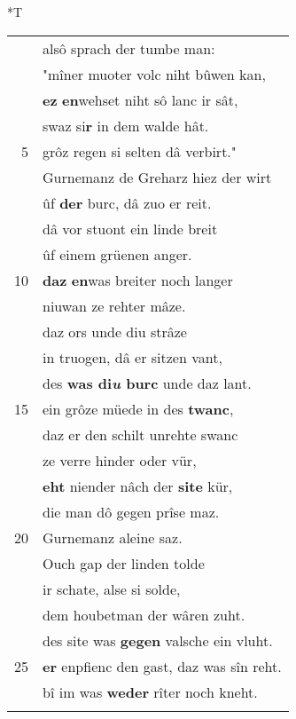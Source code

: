\documentclass[8pt,a4paper,notitlepage]{article}
\begin{document}
\begin{table}[ht]
\begin{minipage}[t]{0.5\linewidth}
\end{minipage}
\hspace{0.5cm}
\begin{minipage}[t]{0.5\linewidth}
\small
\begin{center}*T
\end{center}
\begin{tabular}{rl}
 & alsô sprach der tumbe man:\\ 
 & "mîner muoter volc niht bûwen kan,\\ 
 & \textbf{ez} \textbf{en}wehset niht sô lanc ir sât,\\ 
 & swaz si\textbf{r} in dem walde hât.\\ 
5 & grôz regen si selten dâ verbirt."\\ 
 & Gurnemanz de Greharz hiez der wirt\\ 
 & ûf \textbf{der} burc, dâ zuo er reit.\\ 
 & dâ vor stuont ein linde breit\\ 
 & ûf einem grüenen anger.\\ 
10 & \textbf{daz} \textbf{en}was breiter noch langer\\ 
 & niuwan ze rehter mâze.\\ 
 & daz ors unde diu strâze\\ 
 & in truogen, dâ er sitzen vant,\\ 
 & des \textbf{was di\textit{u} burc} unde daz lant.\\ 
15 & ein grôze müede in des \textbf{twanc},\\ 
 & daz er den schilt unrehte swanc\\ 
 & ze verre hinder oder vür,\\ 
 & \textbf{eht} niender nâch der \textbf{site} kür,\\ 
 & die man dô gegen prîse maz.\\ 
20 & Gurnemanz aleine saz.\\ 
 & Ouch gap der linden tolde\\ 
 & ir schate, alse si solde,\\ 
 & dem houbetman der wâren zuht.\\ 
 & des site was \textbf{gegen} valsche ein vluht.\\ 
25 & \textbf{er} enpfienc den gast, daz was sîn reht.\\ 
 & bî im was \textbf{weder} rîter noch kneht.\\ 
 & \textbf{\begin{large}D\end{large}es antwurt}im dô Parcifal\\ 

\end{tabular}
\end{minipage}
\end{table}
\end{document}
